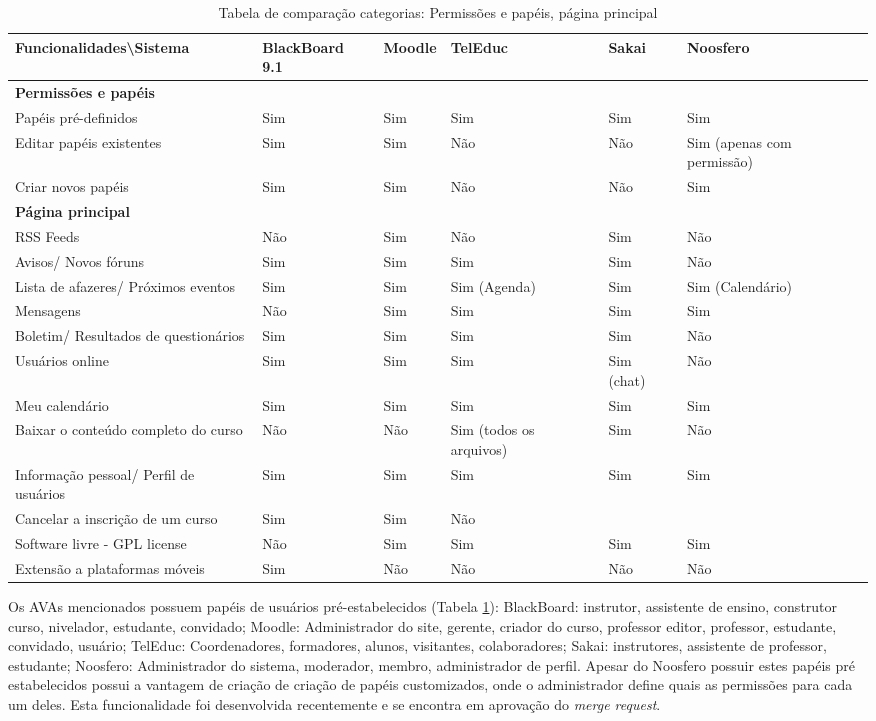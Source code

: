 \begin{landscape}
\begin{table}[H]
\begin{tabular}{|@{}p{5.5cm}|p{3.5cm}|p{3.5cm}|p{3.5cm}|p{3.5cm}|p{3.5cm}@{}|}
\hline
\textbf{Funcionalidades\textbackslash Sistema} & \textbf{BlackBoard 9.1} & \textbf{Moodle} & \textbf{TelEduc} & \textbf{Sakai} & \textbf{Noosfero}\\ \hline
\textbf{Permissões e papéis} &  &  &  &  &  \\
Papéis pré-definidos & Sim & Sim & Sim & Sim & Sim \\
Editar papéis existentes & Sim & Sim & Não & Não & Sim {\tiny(apenas com permissão)} \\
Criar novos papéis & Sim & Sim & Não & Não & Sim \\ \hline
\textbf{Página principal} &  &  &  &  &  \\
RSS Feeds & Não & Sim & Não & Sim & Não \\
Avisos/ Novos fóruns & Sim & Sim & Sim & Sim & Não \\
Lista de afazeres/ Próximos eventos & Sim & Sim & Sim {\tiny(Agenda)} & Sim & Sim {\tiny(Calendário)} \\
Mensagens & Não & Sim & Sim & Sim & Sim \\
Boletim/ Resultados de questionários & Sim & Sim & Sim & Sim & Não \\
Usuários online & Sim & Sim & Sim & Sim {\tiny(chat)} & Não \\
Meu calendário & Sim & Sim & Sim & Sim & Sim \\
Baixar o conteúdo completo do curso & Não & Não & Sim {\tiny(todos os arquivos)} & Sim & Não \\
Informação pessoal/ Perfil de usuários & Sim & Sim & Sim & Sim & Sim \\
Cancelar a inscrição de um curso & Sim & Sim & Não &  &  \\
Software livre - GPL license & Não & Sim & Sim & Sim & Sim \\
Extensão a plataformas móveis & Sim & Não & Não & Não & Não \\ \hline
\end{tabular}
\caption{Tabela de comparação categorias: Permissões e papéis, página principal}
\label{tab:permissoes-principal}
\end{table}

\end{landscape}

Os AVAs mencionados possuem papéis de usuários pré-estabelecidos (Tabela \ref{tab:permissoes-principal}): BlackBoard: instrutor, assistente de ensino, construtor curso, nivelador, estudante, convidado; Moodle: Administrador do site, gerente, criador do curso, professor editor, professor, estudante, convidado, usuário; TelEduc: Coordenadores, formadores, alunos, visitantes, colaboradores; Sakai: instrutores, assistente de professor, estudante; Noosfero: Administrador do sistema, moderador, membro, administrador de perfil. Apesar do Noosfero possuir estes papéis pré estabelecidos possui a vantagem de criação de criação de papéis customizados, onde o administrador define quais as permissões para cada um deles. Esta funcionalidade foi desenvolvida recentemente e se encontra em aprovação do \textit{merge request}.

